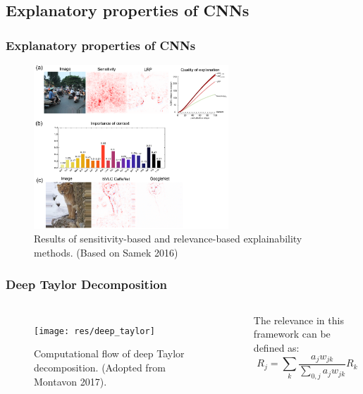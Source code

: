 \documentclass[a4paper,9pt]{beamer}
\theoremstyle{mytheoremstyle}
\begin{document}
\subsection{Explanatory properties of CNNs}

\begin{frame}
\frametitle{Explanatory properties of CNNs}
\begin{figure}
\begin{center}
  \includegraphics[width=0.65\textwidth]{res/sensitivity_vs_relevance}
\end{center}
	\caption{Results of sensitivity-based and relevance-based explainability methods. (Based on Samek 2016)}
\end{figure}
\end{frame}


\begin{frame}
\frametitle{Deep Taylor Decomposition}
\begin{columns}
\begin{figure}
\begin{center}
  \texttt{[image: res/deep\_taylor]}
\end{center}
	\caption{Computational flow of deep Taylor decomposition. (Adopted from Montavon 2017).}
\end{figure}
\begin{exampleblock}{}
The relevance in this framework can be defined as:
\begin{equation}
R_j = \sum _k \frac{a_j w_{jk}}{\sum _{0,j} a_j w_{jk}} R_k
\label{background:lrp.z}
\end{equation}
\end{exampleblock}
\end{columns}
\end{frame}
\end{document}
